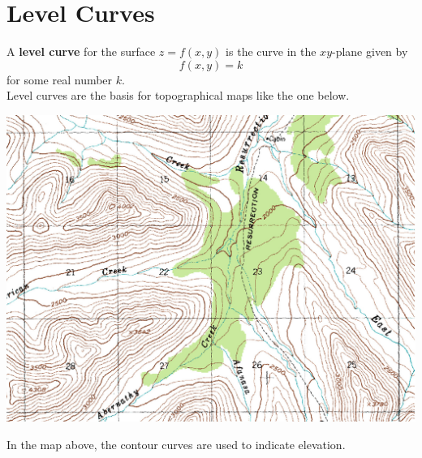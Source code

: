 \documentclass[handout]{ximera}
\begin{document}
\section{Level Curves}
A \textbf{level curve} for the surface $z = f(x, y)$ is the curve in the $xy$-plane given by
\[
f(x, y) = k
\]
for some real number $k$.\\
Level curves are the basis for topographical maps like the one below.
\begin{image}
\includegraphics{topographicalmap.jpg}
\end{image}
In the map above, the contour curves are used to indicate elevation.
\end{document}
